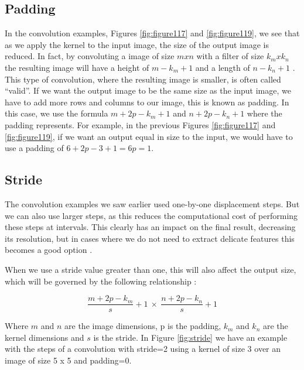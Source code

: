 \subsection{Padding}

In the convolution examples, Figures \ref{fig:figure117} and \ref{fig:figure119}, we see that as we apply the kernel to the input image, the size of the output image is reduced. In fact, by convoluting a image of size $m x n$ with a filter of size $k_m x k_n$ the resulting image will have a height of $m-k_m+1$ and a length of $n-k_n+1$ . This type of convolution, where the resulting image is smaller, is often called “valid”.
If we want the output image to be the same size as the input image, we have to add more rows and columns to our image, this is known as padding. In this case, we use the formula  $m+2p-k_m+1$ and $n+2p-k_n+1$ where the padding represents. For example, in the previous Figures \ref{fig:figure117} and \ref{fig:figure119}, if we want an output equal in size to the input, we would have to use a padding of $6+2p-3+1=6p=1$.

\subsection{Stride}

The convolution examples we saw earlier used one-by-one displacement steps. But we can also use larger steps, as this reduces the computational cost of performing these steps at intervals. This clearly has an impact on the final result, decreasing its resolution, but in cases where we do not need to extract delicate features this becomes a good option \cite{goodfellow2016}.

When we use a stride value greater than one, this will also affect the output size, which will be governed by the following relationship \cite{adrian2017}:

\begin{equation}
\frac{m+2p-k_m}{s}+1 \  \times \ \frac{n+2p-k_n}{s}+1
\end{equation}

Where $m$ and $n$ are the image dimensions, p is the padding, $k_m$ and $k_n$ are the kernel dimensions and $s$ is the stride. In Figure \ref{fig:stride} we have an example with the steps of a convolution with stride=2 using a kernel of size 3 over an image of size 5 x 5 and padding=0.

